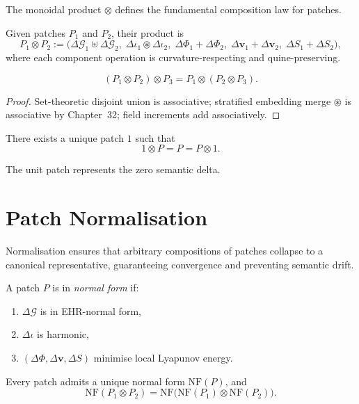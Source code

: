 The monoidal product $\otimes$ defines the fundamental composition law for
patches.

\begin{definition}
Given patches $P_1$ and $P_2$, their product is
\[
P_1 \otimes P_2 :=
\bigl(
\Delta\mathcal{G}_1 \uplus \Delta\mathcal{G}_2,
\;
\Delta\iota_1 \circledast \Delta\iota_2,
\;
\Delta\Phi_1+\Delta\Phi_2,
\;
\Delta\mathbf{v}_1+\Delta\mathbf{v}_2,
\;
\Delta S_1+\Delta S_2
\bigr),
\]
where each component operation is curvature-respecting and quine-preserving.
\end{definition}

\begin{theorem}[Associativity]
\[
(P_1\otimes P_2)\otimes P_3 = P_1 \otimes (P_2 \otimes P_3).
\]
\end{theorem}

\begin{proof}
Set-theoretic disjoint union is associative; stratified embedding merge
$\circledast$ is associative by Chapter~32; field increments add associatively.
\end{proof}

\begin{theorem}
There exists a unique patch $1$ such that
\[
1\otimes P = P = P\otimes 1.
\]
\end{theorem}

The unit patch represents the zero semantic delta.


\section{Patch Normalisation}
\label{sec:52:normalisation}

Normalisation ensures that arbitrary compositions of patches collapse to a
canonical representative, guaranteeing convergence and preventing semantic drift.

\begin{definition}
A patch $P$ is in \emph{normal form} if:
\begin{enumerate}
  \item $\Delta\mathcal{G}$ is in EHR-normal form,
  \item $\Delta\iota$ is harmonic,
  \item $(\Delta\Phi,\Delta\mathbf{v},\Delta S)$ minimise local Lyapunov energy.
\end{enumerate}
\end{definition}

\begin{theorem}
Every patch admits a unique normal form $\mathrm{NF}(P)$, and
\[
\mathrm{NF}(P_1 \otimes P_2)
  = \mathrm{NF}\bigl(\mathrm{NF}(P_1)\otimes \mathrm{NF}(P_2)\bigr).
\]
\end{theorem}

